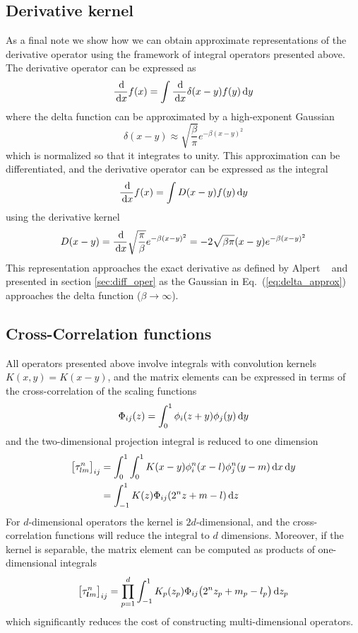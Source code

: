 \subsection{Derivative kernel}
As a final note we show how we can obtain approximate representations of the 
derivative operator using the framework of integral operators presented above. 
The derivative operator can be expressed as
\begin{equation}
    \frac{\,\mathrm{d}}{\,\mathrm{d} x} f(x) = \int \frac{\,\mathrm{d}}{\,\mathrm{d} x} \delta(x-y) f(y) \,\mathrm{d} y
\end{equation}
where the delta function can be approximated by a high-exponent Gaussian
\begin{equation}
    \label{eq:delta_approx}
    \delta(x-y) \approx \sqrt{\frac{\beta}{\pi}} e^{-\beta (x-y)^2}
\end{equation}
which is normalized so that it integrates to unity. This approximation can be 
differentiated, and the derivative operator can be expressed as the integral
\begin{equation}
    \frac{\,\mathrm{d}}{\,\mathrm{d} x} f(x) = \int D(x-y)f(y) \,\mathrm{d} y
\end{equation}
using the derivative kernel
\begin{equation}
    D(x-y)  = \frac{\,\mathrm{d}}{\,\mathrm{d} x} \sqrt{\frac{\pi}{\beta}}e^{-\beta (x-y)^2} 
	    = -2 \sqrt{\beta\pi}(x-y)e^{-\beta (x-y)^2}
\end{equation}
This representation approaches the exact derivative as defined by Alpert 
\etal~\cite{Alpert:2002p149} and presented in section \ref{sec:diff_oper} as 
the Gaussian in Eq.~(\ref{eq:delta_approx}) approaches the delta function 
($\beta \rightarrow \infty$).

\subsection{Cross-Correlation functions}
All operators presented above involve integrals with convolution kernels
$K(x,y) = K(x-y)$, and the matrix elements can be expressed in terms of the
cross-correlation of the scaling functions~\cite{Fann:2004}
\begin{equation}
    \Phi_{ij}(z) = \int_0^1 \phi_i(z+y)\phi_j(y) \,\mathrm{d} y
\end{equation}
and the two-dimensional projection integral is reduced to one dimension
\begin{align}
    \big[\tau_{lm}^n\big]_{ij}	&= \int_0^1 \int_0^1 K(x-y)\phi_i^n(x-l)\phi_j^n(y-m) \,\mathrm{d} x \,\mathrm{d} y \\
				&= \int_{-1}^1 K(z)\Phi_{ij}(2^nz+m-l)\,\mathrm{d} z
\end{align}
For $d$-dimensional operators the kernel is $2d$-dimensional, and the cross-correlation 
functions will reduce the integral to $d$ dimensions. Moreover, if the kernel is
separable, the matrix element can be computed as products of one-dimensional integrals
\begin{equation}
    \big[\tau_{\boldsymbol lm}^n\big]_{ij} = \prod_{p=1}^d\int_{-1}^1 
	K_p(z_p)\Phi_{ij}\big(2^nz_p+m_p-l_p\big) \,\mathrm{d} z_p
\end{equation}
which significantly reduces the cost of constructing multi-dimensional operators. 

